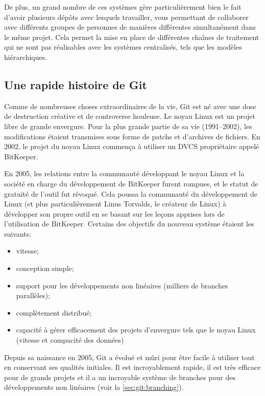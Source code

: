De plus, un grand nombre de ces systèmes gère particulièrement bien le fait d'avoir plusieurs dépôts avec lesquels travailler, vous permettant de collaborer avec différents groupes de personnes de manières différentes simultanément dans le même projet.
Cela permet la mise en place de différentes chaînes de traitement qui ne sont pas réalisables avec les systèmes centralisés, tels que les modèles hiérarchiques.

\subsection{Une rapide histoire de Git}

Comme de nombreuses choses extraordinaires de la vie, Git est né avec une dose de destruction créative et de controverse houleuse.
Le noyau Linux est un projet libre de grande envergure.
Pour la plus grande partie de sa vie (1991–2002), les modifications étaient transmises sous forme de patchs et d'archives de fichiers.
En 2002, le projet du noyau Linux commença à utiliser un DVCS propriétaire appelé BitKeeper.

En 2005, les relations entre la communauté développant le noyau Linux et la société en charge du développement de BitKeeper furent rompues, et le statut de gratuité de l'outil fut révoqué.
Cela poussa la communauté du développement de Linux (et plus particulièrement Linus Torvalds, le créateur de Linux) à développer son propre outil en se basant sur les leçons apprises lors de l'utilisation de BitKeeper.
Certains des objectifs du nouveau système étaient les suivants:

\begin{itemize}
\item vitesse;
\item conception simple;
\item support pour les développements non linéaires (milliers de branches parallèles);
\item complètement distribué;
\item capacité à gérer efficacement des projets d'envergure tels que le noyau Linux (vitesse et compacité des données)
\end{itemize}

Depuis sa naissance en 2005, Git a évolué et mûri pour être facile à utiliser tout en conservant ses qualités initiales.
Il est incroyablement rapide, il est très efficace pour de grands projets et il a un incroyable système de branches pour des développements non linéaires (voir la \autoref{sec:git:branching}).

